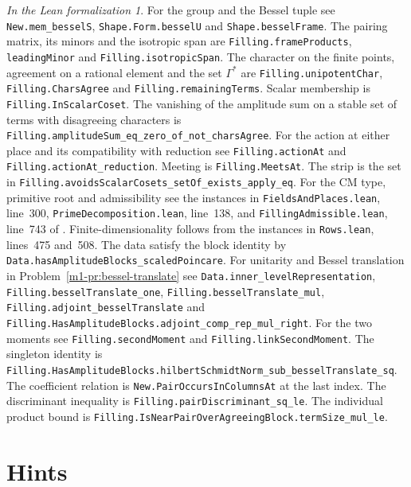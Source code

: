 \documentclass[reqno]{amsart}
\theoremstyle{definition}
\theoremstyle{plain}
\theoremstyle{remark}
\newtheorem*{leanremark}{In the Lean formalization}
\newcommand{\tl}[1]{\texttt{#1}}
\begin{document}
\begin{leanremark}
For the group and the Bessel tuple see \tl{New.mem\_besselS}, \tl{Shape.Form.besselU} and \tl{Shape.besselFrame}.  The pairing matrix, its minors and the isotropic span are \tl{Filling.frameProducts}, \tl{leadingMinor} and \tl{Filling.isotropicSpan}.  The character on the finite points, agreement on a rational element and the set \(\Gamma^*\) are \tl{Filling.unipotentChar}, \tl{Filling.CharsAgree} and \tl{Filling.remainingTerms}.  Scalar membership is \tl{Filling.InScalarCoset}.  The vanishing of the amplitude sum on a stable set of terms with disagreeing characters is \tl{Filling.amplitudeSum\_eq\_zero\_of\_not\_charsAgree}.  For the action at either place and its compatibility with reduction see \tl{Filling.actionAt} and \tl{Filling.actionAt\_reduction}.  Meeting is \tl{Filling.MeetsAt}.  The strip is the set in \tl{Filling.avoidsScalarCosets\_setOf\_exists\_apply\_eq}.  For the CM type, primitive root and admissibility see the instances in \tl{FieldsAndPlaces.lean}, line~300, \tl{PrimeDecomposition.lean}, line~138, and \tl{FillingAdmissible.lean}, line~743 of \cite{GL}.  Finite-dimensionality follows from the instances in \tl{Rows.lean}, lines~475 and~508.  The data satisfy the block identity by \tl{Data.hasAmplitudeBlocks\_scaledPoincare}.  For unitarity and Bessel translation in Problem~\ref{m1-pr:bessel-translate} see \tl{Data.inner\_levelRepresentation}, \tl{Filling.besselTranslate\_one}, \tl{Filling.besselTranslate\_mul}, \tl{Filling.adjoint\_besselTranslate} and \tl{Filling.HasAmplitudeBlocks.adjoint\_comp\_rep\_mul\_right}.  For the two moments see \tl{Filling.secondMoment} and \tl{Filling.linkSecondMoment}.  The singleton identity is \tl{Filling.HasAmplitudeBlocks.hilbertSchmidtNorm\_sub\_besselTranslate\_sq}.  The coefficient relation is \tl{New.PairOccursInColumnsAt} at the last index.  The discriminant inequality is \tl{Filling.pairDiscriminant\_sq\_le}.  The individual product bound is \tl{Filling.IsNearPairOverAgreeingBlock.}\allowbreak\tl{termSize\_mul\_le}.
\end{leanremark}

\section*{Hints}
\end{document}
